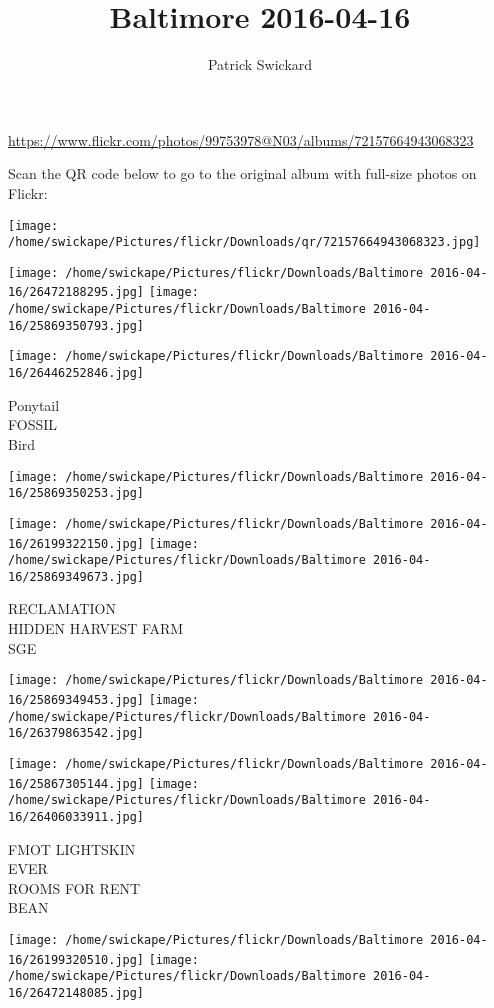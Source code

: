 \documentclass[10pt,letterpaper]{article}
\title{Baltimore 2016-04-16}
\author{Patrick Swickard}
\date{}
\begin{document}
\maketitle

\url{https://www.flickr.com/photos/99753978@N03/albums/72157664943068323}

Scan the QR code below to go to the original album with full-size photos on Flickr:

\texttt{[image: /home/swickape/Pictures/flickr/Downloads/qr/72157664943068323.jpg]}
\pagebreak

\texttt{[image: /home/swickape/Pictures/flickr/Downloads/Baltimore 2016-04-16/26472188295.jpg]}
\texttt{[image: /home/swickape/Pictures/flickr/Downloads/Baltimore 2016-04-16/25869350793.jpg]}

\texttt{[image: /home/swickape/Pictures/flickr/Downloads/Baltimore 2016-04-16/26446252846.jpg]}

Ponytail\\
FOSSIL\\
Bird
\pagebreak

\texttt{[image: /home/swickape/Pictures/flickr/Downloads/Baltimore 2016-04-16/25869350253.jpg]}

\vspace{0.25in}
\texttt{[image: /home/swickape/Pictures/flickr/Downloads/Baltimore 2016-04-16/26199322150.jpg]}
\texttt{[image: /home/swickape/Pictures/flickr/Downloads/Baltimore 2016-04-16/25869349673.jpg]}

RECLAMATION\\
HIDDEN HARVEST FARM\\
SGE
\pagebreak

\texttt{[image: /home/swickape/Pictures/flickr/Downloads/Baltimore 2016-04-16/25869349453.jpg]}
\texttt{[image: /home/swickape/Pictures/flickr/Downloads/Baltimore 2016-04-16/26379863542.jpg]}

\texttt{[image: /home/swickape/Pictures/flickr/Downloads/Baltimore 2016-04-16/25867305144.jpg]}
\texttt{[image: /home/swickape/Pictures/flickr/Downloads/Baltimore 2016-04-16/26406033911.jpg]}

FMOT LIGHTSKIN\\
EVER\\
ROOMS FOR RENT\\
BEAN
\pagebreak

\texttt{[image: /home/swickape/Pictures/flickr/Downloads/Baltimore 2016-04-16/26199320510.jpg]}
\texttt{[image: /home/swickape/Pictures/flickr/Downloads/Baltimore 2016-04-16/26472148085.jpg]}
\end{document}
